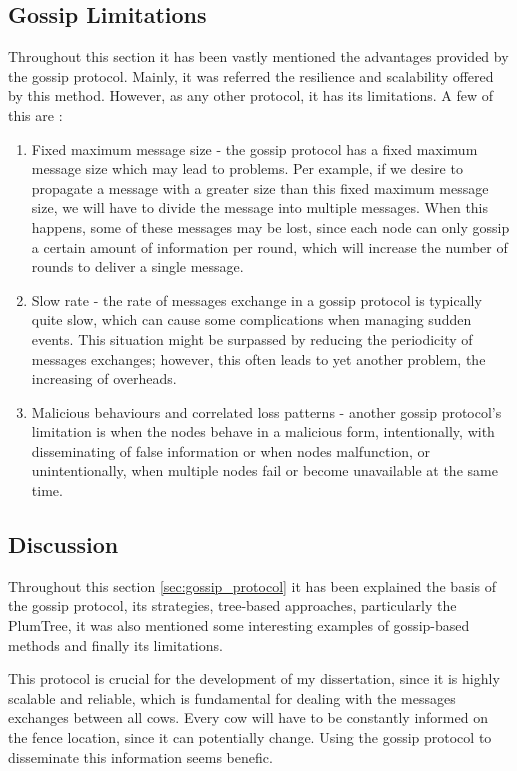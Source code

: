\subsection{Gossip Limitations}
\label{subsec:gossip_limitations}
Throughout this section it has been vastly mentioned the advantages provided by the gossip
protocol. Mainly, it was referred the resilience and scalability offered by this method.
However, as any other protocol, it has its limitations. A few of this are \cite{Birman2007}:
\begin{enumerate}
    \item Fixed maximum message size - the gossip protocol has a fixed maximum message size
          which may lead to problems. Per example, if we desire to propagate a message with a
          greater size than this fixed maximum message size, we will have to divide the message
          into multiple messages. When this happens, some of these messages may be lost, since
          each node can only gossip a certain amount of information per round, which will
          increase the number of rounds to deliver a single message.
    \item Slow rate - the rate of messages exchange in a gossip protocol is typically quite
          slow, which can cause some complications when managing sudden events. This situation
          might be surpassed by reducing the periodicity of messages exchanges; however, this
          often leads to yet another problem, the increasing of overheads.
    \item Malicious behaviours and correlated loss patterns - another gossip protocol's limitation
          is when the nodes behave in a malicious form, intentionally, with disseminating of
          false information or when nodes malfunction, or unintentionally, when multiple nodes
          fail or become unavailable at the same time.
\end{enumerate}


\subsection{Discussion}
\label{subsec:gossip_discussion}
Throughout this section \ref{sec:gossip_protocol} it has been explained the basis of the
gossip protocol, its strategies, tree-based approaches, particularly the PlumTree, it was
also mentioned some interesting examples of gossip-based methods and finally its limitations.

This protocol is crucial for the development of my dissertation, since it is highly scalable
and reliable, which is fundamental for dealing with the messages exchanges between all cows.
Every cow will have to be constantly informed on the fence location, since it can potentially
change. Using the gossip protocol to disseminate this information seems benefic.

